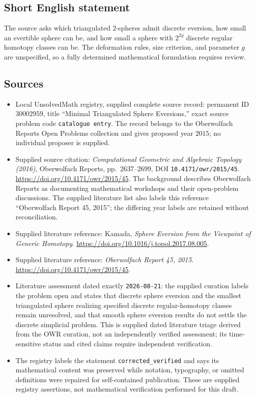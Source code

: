 \documentclass[11pt]{article}
\begin{document}
\subsection{Short English statement}
The source asks which triangulated \(2\)-spheres admit discrete eversion, how small an evertible sphere can be, and how small a sphere with \(2^{2g}\) discrete regular homotopy classes can be. The deformation rules, size criterion, and parameter \(g\) are unspecified, so a fully determined mathematical formulation requires review.
\subsection{Sources}
\begin{itemize}
\item Local UnsolvedMath registry, supplied complete source record: permanent ID \(30002959\), title ``Minimal Triangulated Sphere Eversions,'' exact source problem code \texttt{catalogue entry}. The record belongs to the Oberwolfach Reports Open Problems collection and gives proposed year \(2015\); no individual proposer is supplied.
\item Supplied source citation: \emph{Computational Geometric and Algebraic Topology (2016)}, Oberwolfach Reports, pp.\ 2637--2699, DOI \texttt{10.4171/owr/2015/45}. \url{https://doi.org/10.4171/owr/2015/45}. The background describes Oberwolfach Reports as documenting mathematical workshops and their open-problem discussions. The supplied literature list also labels this reference ``Oberwolfach Report 45, 2015''; the differing year labels are retained without reconciliation.
\item Supplied literature reference: Kamada, \emph{Sphere Eversion from the Viewpoint of Generic Homotopy}. \url{https://doi.org/10.1016/j.topol.2017.08.005}.
\item Supplied literature reference: \emph{Oberwolfach Report 45, 2015}. \url{https://doi.org/10.4171/owr/2015/45}.
\item Literature assessment dated exactly \texttt{2026-08-21}: the supplied curation labels the problem open and states that discrete sphere eversion and the smallest triangulated sphere realizing specified discrete regular-homotopy classes remain unresolved, and that smooth sphere eversion results do not settle the discrete simplicial problem. This is supplied dated literature triage derived from the OWR curation, not an independently verified assessment; its time-sensitive status and cited claims require independent verification.
\item The registry labels the statement \texttt{corrected\_verified} and says its mathematical content was preserved while notation, typography, or omitted definitions were repaired for self-contained publication. These are supplied registry assertions, not mathematical verification performed for this draft.
\end{itemize}
\end{document}
